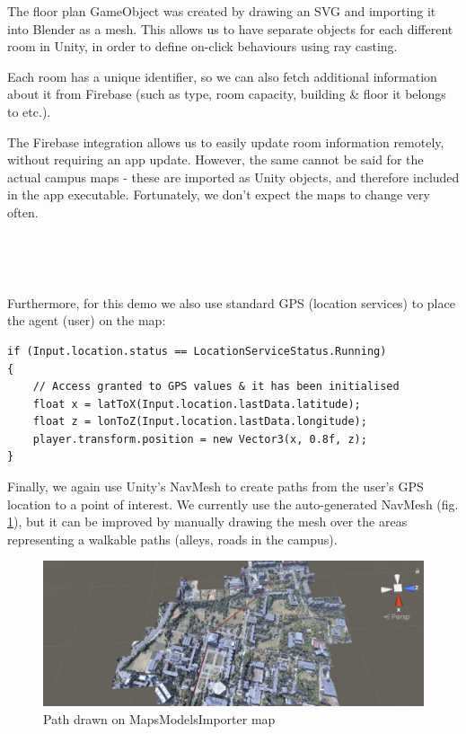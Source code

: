         The floor plan GameObject was created by drawing an SVG and importing it into Blender as a mesh. This allows us to have separate objects for each different room in Unity, in order to define on-click behaviours using ray casting.
        
        Each room has a unique identifier, so we can also fetch additional information about it from Firebase (such as type, room capacity, building & floor it belongs to etc.).
        
        The Firebase integration allows us to easily update room information remotely, without requiring an app update. However, the same cannot be said for the actual campus maps - these are imported as Unity objects, and therefore included in the app executable. Fortunately, we don't expect the maps to change very often.
        
        ~
        
        ~
        
        Furthermore, for this demo we also use standard GPS (location services) to place the agent (user) on the map:
        
        \begin{verbatim}
if (Input.location.status == LocationServiceStatus.Running)
{
    // Access granted to GPS values & it has been initialised
    float x = latToX(Input.location.lastData.latitude);
    float z = lonToZ(Input.location.lastData.longitude);
    player.transform.position = new Vector3(x, 0.8f, z);
}
        \end{verbatim}
        
        Finally, we again use Unity’s NavMesh to create paths from the user’s GPS location to a point of interest. We currently use the auto-generated NavMesh (fig. \ref{3:fig:mapsmodelsimporter_path}), but it can be improved by manually drawing the mesh over the areas representing a walkable paths (alleys, roads in the campus).
        
        \begin{figure}[ht]
            \centering
            \includegraphics[width=\textwidth]{figures/demos/mapsmodelsimporter_path.png}
            \caption{Path drawn on MapsModelsImporter map}
            \label{3:fig:mapsmodelsimporter_path}
        \end{figure}
    
